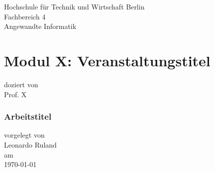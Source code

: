 \thispagestyle{empty}
{\begin{flushright}
Hochschule für Technik und Wirtschaft Berlin\\
Fachbereich 4\\
Angewandte Informatik\\
\end{flushright}
\part*{Modul X: Veranstaltungstitel }
\begin{flushleft}
doziert von\\
Prof. X\\
\vfill
\section*{Arbeitstitel}
vorgelegt von\\
Leonardo Ruland\\
am\\
\today
\end{flushleft}}
\newpage
